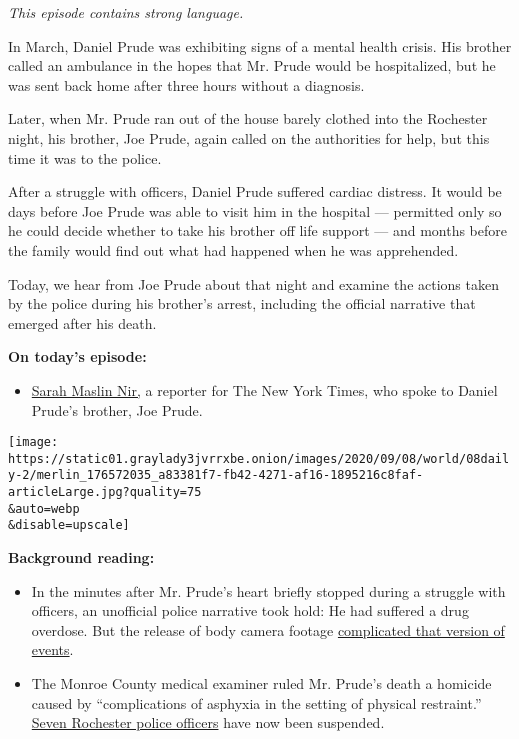 \emph{This episode contains strong language.}

In March, Daniel Prude was exhibiting signs of a mental health crisis.
His brother called an ambulance in the hopes that Mr. Prude would be
hospitalized, but he was sent back home after three hours without a
diagnosis.

Later, when Mr. Prude ran out of the house barely clothed into the
Rochester night, his brother, Joe Prude, again called on the authorities
for help, but this time it was to the police.

After a struggle with officers, Daniel Prude suffered cardiac distress.
It would be days before Joe Prude was able to visit him in the hospital
--- permitted only so he could decide whether to take his brother off
life support --- and months before the family would find out what had
happened when he was apprehended.

Today, we hear from Joe Prude about that night and examine the actions
taken by the police during his brother's arrest, including the official
narrative that emerged after his death.

\textbf{On today's episode:}

\begin{itemize}
\tightlist
\item
  \href{https://www.nytimes3xbfgragh.onion/by/sarah-maslin-nir}{Sarah
  Maslin Nir,} a reporter for The New York Times, who spoke to Daniel
  Prude's brother, Joe Prude.
\end{itemize}

\texttt{[image: https://static01.graylady3jvrrxbe.onion/images/2020/09/08/world/08daily-2/merlin\_176572035\_a83381f7-fb42-4271-af16-1895216c8faf-articleLarge.jpg?quality=75\\\&auto=webp\\\&disable=upscale]}

\textbf{Background reading:}

\begin{itemize}
\item
  In the minutes after Mr. Prude's heart briefly stopped during a
  struggle with officers, an unofficial police narrative took hold: He
  had suffered a drug overdose. But the release of body camera footage
  \href{https://www.nytimes3xbfgragh.onion/2020/09/04/nyregion/rochester-police-daniel-prude.html}{complicated
  that version of events}.
\item
  The Monroe County medical examiner ruled Mr. Prude's death a homicide
  caused by ``complications of asphyxia in the setting of physical
  restraint.''
  \href{https://www.nytimes3xbfgragh.onion/2020/09/03/nyregion/daniel-prude-police-rochester.html}{Seven
  Rochester police officers} have now been suspended.
\end{itemize}

